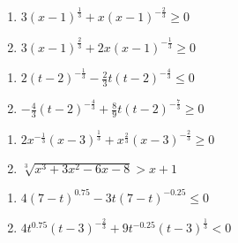 \begin{multicols}{2}
\begin{enumerate}
\setcounter{enumi}{\value{HW}}


\item  $3(x-1)^{\frac{1}{3}} +x (x-1)^{-\frac{2}{3}} \geq 0$ %

\item $3(x-1)^{\frac{2}{3}} +2x (x-1)^{-\frac{1}{3}} \geq 0$ %

\setcounter{HW}{\value{enumi}}
\end{enumerate}
\end{multicols}


\begin{multicols}{2}
\begin{enumerate}
\setcounter{enumi}{\value{HW}}


\item  $2 (t-2)^{-\frac{1}{3}} -\frac{2}{3} t(t-2)^{-\frac{4}{3}} \leq 0$ 
\item  $-\frac{4}{3} (t-2)^{-\frac{4}{3}} + \frac{8}{9} t (t-2)^{-\frac{7}{3}} \geq 0$

\setcounter{HW}{\value{enumi}}
\end{enumerate}
\end{multicols}

\begin{enumerate}
\setcounter{enumi}{\value{HW}}

\item  $2x^{-\frac{1}{3}}(x-3)^{\frac{1}{3}} + x^{\frac{2}{3}} (x-3)^{-\frac{2}{3}} \geq 0$
\item $\sqrt[3]{x^{3} + 3x^{2} - 6x - 8} > x + 1$ 

\setcounter{HW}{\value{enumi}}
\end{enumerate}

\begin{enumerate}
\setcounter{enumi}{\value{HW}}

\item $4(7-t)^{0.75} - 3t(7-t)^{-0.25} \leq 0$   %

\item $4t^{0.75}(t - 3)^{-\frac{2}{3}} +9t^{-0.25}(t - 3)^{\frac{1}{3}} < 0$

\setcounter{HW}{\value{enumi}}
\end{enumerate}

